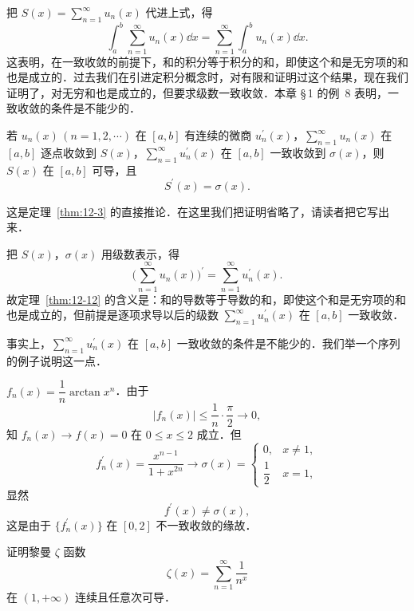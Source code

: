 把 $S(x)=\displaystyle\sum_{n=1}^{\infty}u_{n}(x)$ 代进上式，得
\[
\int_{a}^{b}\sum_{n=1}^{\infty}u_{n}(x)\dd x=\sum_{n=1}^{\infty}\int_{a}^{b}u_{n}(x)\dd x.
\]
这表明，在一致收敛的前提下，和的积分等于积分的和，即使这个和是无穷项的和也是成立的．过去我们在引进定积分概念时，对有限和证明过这个结果，现在我们证明了，对无穷和也是成立的，但要求级数一致收敛．本章 \S\,1 的例~8 表明，一致收敛的条件是不能少的．

\begin{theorem}[逐项求导]\label{thm:12-12}
若 $u_{n}(x)\,(n=1,2,\cdots)$ 在 $[a,b]$ 有连续的微商 $u_{n}^{\prime}(x)$，$\displaystyle\sum_{n=1}^{\infty}u_{n}(x)$ 在 $[a,b]$ 逐点收敛到 $S(x)$，$\displaystyle\sum_{n=1}^{\infty}u_{n}^{\prime}(x)$ 在 $[a,b]$ 一致收敛到 $\sigma(x)$，则 $S(x)$ 在 $[a,b]$ 可导，且
\[
S^{\prime}(x)=\sigma(x).
\]
\end{theorem}

这是定理~\ref{thm:12-3} 的直接推论．在这里我们把证明省略了，请读者把它写出来．

把 $S(x)$，$\sigma(x)$ 用级数表示，得
\[
\Big(\sum_{n=1}^{\infty}u_{n}(x)\Big)^{\prime}=\sum_{n=1}^{\infty}u_{n}^{\prime}(x).
\]
故定理~\ref{thm:12-12} 的含义是：和的导数等于导数的和，即使这个和是无穷项的和也是成立的，但前提是逐项求导以后的级数 $\displaystyle\sum_{n=1}^{\infty}u_{n}^{\prime}(x)$ 在 $[a,b]$ 一致收敛．

事实上，$\displaystyle\sum_{n=1}^{\infty}u_{n}^{\prime}(x)$ 在 $[a,b]$ 一致收敛的条件是不能少的．我们举一个序列的例子说明这一点．

\begin{example}\label{ex:12-3-1}
$f_{n}(x)=\dfrac{1}{n}\arctan x^{n}$．由于
\[
\left|f_{n}(x)\right|\leqslant\frac{1}{n}\cdot\frac{\pi}{2}\to 0,
\]
知 $f_{n}(x)\to f(x)=0$ 在 $0\leqslant x\leqslant 2$ 成立．但
\[
f_{n}^{\prime}(x)=\frac{x^{n-1}}{1+x^{2n}}\to\sigma(x)=\begin{cases}
0, & x\neq 1,\\[3pt]
\dfrac{1}{2} & x=1,
\end{cases}
\]
显然
\[
f^{\prime}(x)\neq\sigma(x),
\]
这是由于 $\{f_{n}^{\prime}(x)\}$ 在 $[0,2]$ 不一致收敛的缘故．
\end{example}

\begin{example}\label{ex:12-3-2}
证明黎曼 $\zeta$ 函数
\[
\zeta(x)=\sum_{n=1}^{\infty}\frac{1}{n^{x}}
\]
在 $(1,+\infty)$ 连续且任意次可导．
\end{example}

